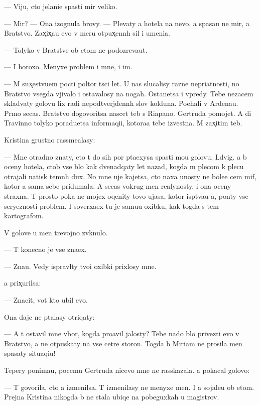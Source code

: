 \documentclass[10pt]{book}
\begin{document}
— Viju, cto jelani{\y}e spasti mir veliko.

— Mir? — Ona izognula brovy. — Plevaty {\y}a hotela na nevo. {\Y}a spasa{\y}u ne mir, a Bratstvo. Zax̨ix̨a{\y}u {\y}evo v meru otpux̨enn{\yi}h sil i umeni{\y}a.

— Tolyko v Bratstve ob etom ne podozreva{\y}ut.

— I horoxo. Menyxe problem i mne, i im.

— M{\yi} sux̨estvu{\y}em pocti poltor{\yi} t{\yi}s{\ia}ci let. U nas slucalisy razn{\yi}{\y}e nepri{\y}atnosti, no Bratstvo vsegda v{\yi}jivalo i ostavalosy na nogah. Ostanetsa i vpredy. Tebe nezacem sklad{\yi}vaty golovu lix radi nepodtverjdenn{\yi}h slov kolduna. Po{\y}ehali v Ardenau. Pr{\ia}mo se{\y}cas. Bratstvo dogovoritsa nascet teb{\ia} s Riapano. Gertruda pomojet. A di Travinno tolyko poradu{\y}etsa informaqi{\y}i, kotora{\y}a tebe izvestna. M{\yi} zax̨itim teb{\ia}.

Kristina grustno rassme{\y}alasy:

— Mne otradno znaty, cto t{\yi} do sih por p{\yi}ta{\y}exysa spasti mo{\y}u golovu, L{\iu}dvig. {\Y}a b{\yi} oceny hotela, ctob{\yi} vse b{\yi}lo kak dvenadqaty let nazad, kogda m{\yi} plecom k plecu otrajali natisk temn{\yi}h dux. No mne uje kajetsa, cto naxa {\y}unosty ne bole{\y}e cem mif, kotor{\yi}{\y} {\y}a sama sebe pridumala. A se{\y}cas vokrug men{\ia} realynosty, i ona oceny straxna. T{\yi} prosto poka ne mojex oqenity tovo ujasa, kotor{\yi}{\y} isp{\yi}t{\yi}va{\y}u {\y}a, pon{\ia}ty vse{\y} seryeznosti problem{\yi}. I soverxa{\y}ex tu je samu{\y}u oxibku, kak togda s tem kartografom.

V golove u men{\ia} trevojno zv{\ia}knulo.

— T{\yi} konecno je vse zna{\y}ex.

— Zna{\y}u. Vedy ispravl{\ia}ty tvo{\y}i oxibki prixlosy mne.

{\Y}a prix̨urilsa:

— Znacit, vot kto ubil {\y}evo.

Ona daje ne p{\yi}talasy otriqaty:

— A t{\yi} ostavil mne v{\yi}bor, kogda pro{\y}avil jalosty? Tebe nado b{\yi}lo privezti {\y}evo v Bratstvo, a ne otpuskaty na vse cet{\yi}re storon{\yi}. Togda b{\yi} Miriam ne prosila men{\ia} spasaty situaqi{\y}u!

Tepery ponima{\y}u, pocemu Gertruda nicevo mne ne rasskazala. {\Y}a pokacal golovo{\y}:

— T{\yi} govorila, cto {\y}a izmenilsa. T{\yi} izmenilasy ne menyxe men{\ia}. I {\y}a sojale{\y}u ob etom. Prejn{\ia}{\y}a Kristina nikogda b{\yi} ne stala ubi{\y}qe{\y} na pobeguxkah u magistrov.
\end{document}
